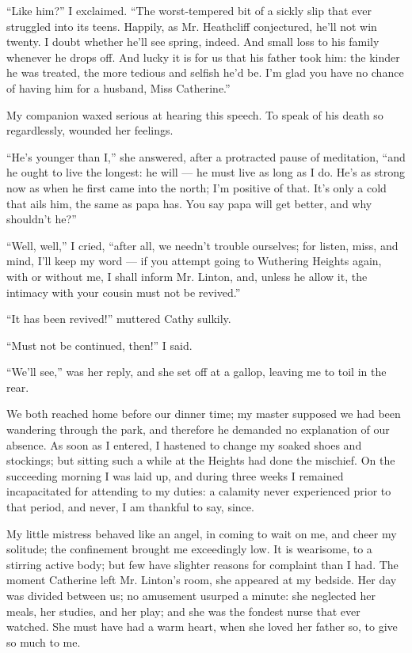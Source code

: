 \par “Like him?” I exclaimed. “The worst-tempered bit of a sickly slip that ever struggled into its teens. Happily, as Mr. Heathcliff conjectured, he'll not win twenty. I doubt whether he'll see spring, indeed. And small loss to his family whenever he drops off. And lucky it is for us that his father took him: the kinder he was treated, the more tedious and selfish he'd be. I'm glad you have no chance of having him for a husband, Miss Catherine.”
\par My companion waxed serious at hearing this speech. To speak of his death so regardlessly, wounded her feelings.
\par “He's younger than I,” she answered, after a protracted pause of meditation, “and he ought to live the longest: he will — he must live as long as I do. He's as strong now as when he first came into the north; I'm positive of that. It's only a cold that ails him, the same as papa has. You say papa will get better, and why shouldn't he?”
\par “Well, well,” I cried, “after all, we needn't trouble ourselves; for listen, miss, and mind, I'll keep my word — if you attempt going to Wuthering Heights again, with or without me, I shall inform Mr. Linton, and, unless he allow it, the intimacy with your cousin must not be revived.”
\par “It has been revived!” muttered Cathy sulkily.
\par “Must not be continued, then!” I said.
\par “We'll see,” was her reply, and she set off at a gallop, leaving me to toil in the rear.
\par We both reached home before our dinner time; my master supposed we had been wandering through the park, and therefore he demanded no explanation of our absence. As soon as I entered, I hastened to change my soaked shoes and stockings; but sitting such a while at the Heights had done the mischief. On the succeeding morning I was laid up, and during three weeks I remained incapacitated for attending to my duties: a calamity never experienced prior to that period, and never, I am thankful to say, since.
\par My little mistress behaved like an angel, in coming to wait on me, and cheer my solitude; the confinement brought me exceedingly low. It is wearisome, to a stirring active body; but few have slighter reasons for complaint than I had. The moment Catherine left Mr. Linton's room, she appeared at my bedside. Her day was divided between us; no amusement usurped a minute: she neglected her meals, her studies, and her play; and she was the fondest nurse that ever watched. She must have had a warm heart, when she loved her father so, to give so much to me.
